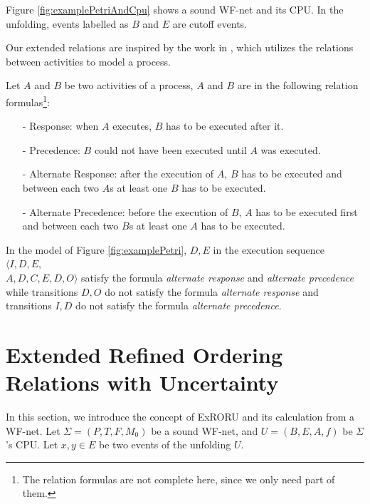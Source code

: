 \documentclass[dvips,...]{llncs}
\begin{document}
\begin{example}\label{ex:petriAndCpu}
Figure \ref{fig:examplePetriAndCpu} shows a sound WF-net and its CPU. In the unfolding, events labelled as $B$ and $E$ are cutoff events.
\end{example}

Our extended relations are inspired by the work in \cite{van2006decserflow}, which utilizes the relations between activities to model a process.
\begin{definition}\label{def:relationFormulas}
Let $A$ and $B$ be two activities of a process, $A$ and $B$ are in the following relation formulas\footnote{The relation formulas \cite{van2006decserflow} are not complete here, since we only need part of them.}:
	\begin{itemize}
		\item[-] Response: when $A$ executes, $B$ has to be executed after it.
		\item[-] Precedence: $B$ could not have been executed until $A$ was executed.
		\item[-] Alternate Response: after the execution of $A$, $B$ has to be executed and between each two $A$s at least one $B$ has to be executed.
		\item[-] Alternate Precedence: before the execution of $B$, $A$ has to be executed first and between each two $B$s at least one $A$ has to be executed.
	\end{itemize}
\end{definition}

\begin{example}\label{ex:relationFormulas}
In the model of Figure \ref{fig:examplePetri}, $D,E$ in the execution sequence $\langle I,D,E,$\\$A,D,C,E,D,O\rangle$ satisfy the formula \textit{alternate response} and \textit{alternate precedence} while transitions $D,O$ do not satisfy the formula \textit{alternate response} and transitions $I,D$ do not satisfy the formula \textit{alternate precedence}.
\end{example}

\section{Extended Refined Ordering Relations with Uncertainty}\label{sec:relations}
In this section, we introduce the concept of ExRORU and its calculation from a WF-net. Let $\Sigma=(P,T,F,M_{0})$ be a sound WF-net, and $U=(B,E,A,f)$ be $\Sigma$'s CPU. Let $x,y\in E$ be two events of the unfolding $U$.
\end{document}
